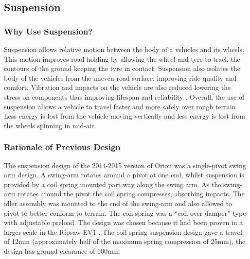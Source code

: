 \subsection{Suspension}
\subsubsection{Why Use Suspension?}
Suspension allows relative motion between the body of a vehicles and its wheels. This motion improves road holding by allowing the wheel and tyre to track the contours of the ground keeping the tyre in contact. Suspension also isolates the body of the vehicles from the uneven road surface, improving ride quality and comfort. Vibration and impacts on the vehicle are also reduced lowering the stress on components thus improving lifespan and reliability \cite{Jazar09}. Overall, the use of suspension allows a vehicle to travel faster and more safely over rough terrain. Less energy is lost from the vehicle moving vertically and less energy is lost from the wheels spinning in mid-air.

\subsubsection{Rationale of Previous Design}
The suspension design of the 2014-2015 version of Orion was a single-pivot swing arm design. A swing-arm rotates around a pivot at one end, whilst suspension is provided by a coil spring mounted part way along the swing arm. As the swing-arm rotates around the pivot the coil spring compresses, absorbing impacts. The idler assembly was mounted to the end of the swing-arm and also allowed to pivot to better conform to terrain. The coil spring was a “coil over damper” type with adjustable preload. The design was chosen because it had been proven in a larger scale in the Ripsaw EV1 \cite{Howe09}. The coil spring suspension design gave a travel of 12mm (approximately half of the maximum spring compression of 25mm), the design has ground clearance of 100mm.

